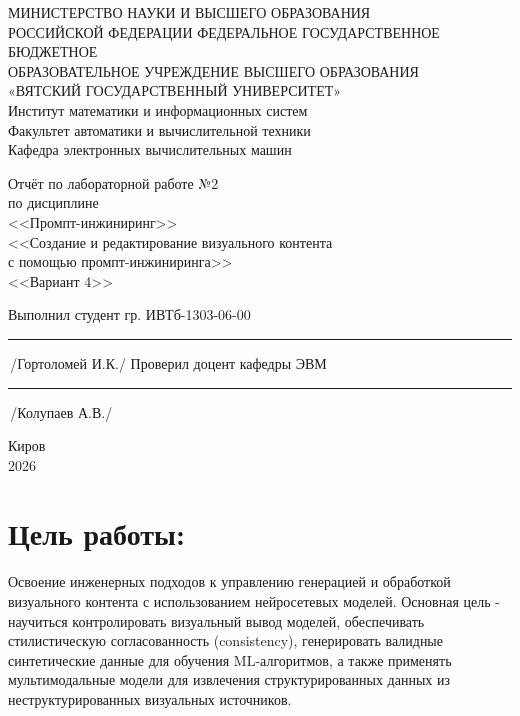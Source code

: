 \documentclass[oneside,a4paper,14pt]{extarticle} %
\begin{document}
	\newpage\thispagestyle{empty}
	\begin{center}
		МИНИСТЕРСТВО НАУКИ И ВЫСШЕГО ОБРАЗОВАНИЯ\\
			РОССИЙСКОЙ ФЕДЕРАЦИИ
			ФЕДЕРАЛЬНОЕ ГОСУДАРСТВЕННОЕ БЮДЖЕТНОЕ\\
			ОБРАЗОВАТЕЛЬНОЕ
			УЧРЕЖДЕНИЕ ВЫСШЕГО ОБРАЗОВАНИЯ\\
			«ВЯТСКИЙ ГОСУДАРСТВЕННЫЙ УНИВЕРСИТЕТ»\\
			Институт математики и информационных систем\\
			Факультет автоматики и вычислительной техники\\
			Кафедра электронных вычислительных машин
	\end{center}
	\vspace{20mm}

	\begin{center}
		Отчёт по лабораторной работе №2\\
		по дисциплине\\
		<<Промпт-инжиниринг>>\\
		<<Создание и редактирование визуального контента \\
с помощью промпт-инжиниринга>>\\
		<<Вариант 4>>\\
	\end{center}
	\vspace{48mm}

	\noindent
	Выполнил студент гр. ИВТб-1303-06-00 \hfill \rule[-0,5mm]{30mm}{0.15mm}\,/Гортоломей И.К./
	\newline
	Проверил доцент кафедры ЭВМ \hfill \rule[-0,5mm]{30mm}{0.15mm}\,/Колупаев А.В./

	\vfill
	\begin{center}
		Киров\\
		2026
	\end{center}

	\newpage
	\thispagestyle{empty}

	\section*{Цель работы:}
Освоение инженерных подходов к управлению генерацией и обработкой визуального
контента с использованием нейросетевых моделей. Основная цель - научиться
контролировать визуальный вывод моделей, обеспечивать стилистическую
согласованность (consistency), генерировать валидные синтетические данные для
обучения ML-алгоритмов, а также применять мультимодальные модели для извлечения
структурированных данных из неструктурированных визуальных источников.
\end{document}
